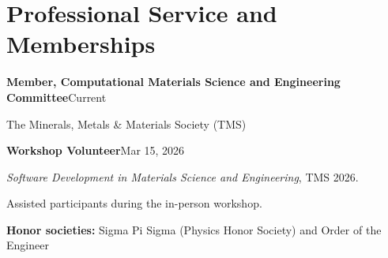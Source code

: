 \section{Professional Service and Memberships}
\textbf{Member, Computational Materials Science and Engineering Committee}\hfill Current\par
The Minerals, Metals \& Materials Society (TMS)

\vspace{0.4em}
\textbf{Workshop Volunteer}\hfill Mar 15, 2026\par
\textit{Software Development in Materials Science and Engineering}, TMS 2026.\par
Assisted participants during the in-person workshop.

\vspace{0.4em}
\textbf{Honor societies:} Sigma Pi Sigma (Physics Honor Society) and Order of the Engineer
